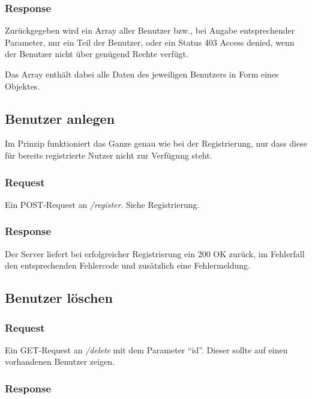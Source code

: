 \documentclass[ngerman]{scrartcl}
\begin{document}
		\subsubsection*{Response}
		
		Zurückgegeben wird ein Array aller Benutzer bzw., bei Angabe entsprechender Parameter, nur ein Teil der Benutzer, oder ein Status 403 Access denied, wenn der Benutzer nicht über genügend Rechte verfügt.
		
		Das Array enthält dabei alle Daten des jeweiligen Benutzers in Form eines Objektes.
	
	\subsection{Benutzer anlegen}
	
		Im Prinzip funktioniert das Ganze genau wie bei der Registrierung, nur dass diese für bereits registrierte Nutzer nicht zur Verfügung steht.
	
		\subsubsection*{Request}
		
		Ein POST-Request an \textit{/register}. Siehe Registrierung.
		
		\subsubsection*{Response}
		
		Der Server liefert bei erfolgreicher Registrierung ein 200 OK zurück, im Fehlerfall den entsprechenden Fehlercode und zusätzlich eine Fehlermeldung.
	
	\subsection{Benutzer löschen}
	
		\subsubsection*{Request}
		
		Ein GET-Request an \textit{/delete} mit dem Parameter 		"`id"'.
		Dieser sollte auf einen vorhandenen Benutzer zeigen.
		
		\subsubsection*{Response}
		
\end{document}
